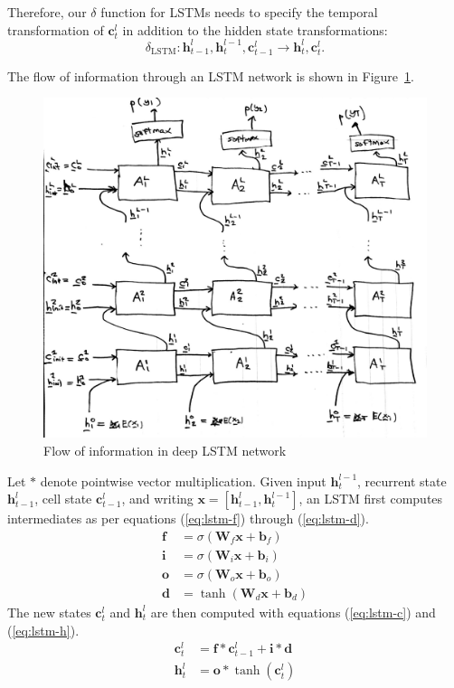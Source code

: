 \documentclass[12pt,a4paper,twoside,openright]{report}
\newcommand{\vect}[1]{\boldsymbol{\mathbf{#1}}}
\begin{document}
Therefore, our $\delta$ function for LSTMs needs to specify the temporal
transformation of $\vect{c}_t^l$ in addition to the hidden state
transformations:
$$ \delta_{\mathrm{LSTM}} : \vect{h}_{t-1}^l, \vect{h}_t^{l-1}, \vect{c}_{t-1}^l
\rightarrow \vect{h}_t^l, \vect{c}_t^l. $$

The flow of information through an LSTM network is shown in
Figure~\ref{fig:deep-lstm-arch}.

\begin{figure}[H]
\centering
\includegraphics[width=400pt]{figs/lstm_net_tmp.jpg}
\caption{Flow of information in deep LSTM network}
\label{fig:deep-lstm-arch}
\end{figure}

Let $\ast$ denote pointwise vector multiplication. Given input
$\vect{h}_t^{l-1}$, recurrent state $\vect{h}_{t-1}^l$, cell state
$\vect{c}_{t-1}^l$, and writing $\vect{x} = [\vect{h}_{t-1}^l,
\vect{h}_t^{l-1}]$, an LSTM first computes intermediates as per equations
(\ref{eq:lstm-f}) through (\ref{eq:lstm-d}).
\begin{align}
  \vect{f} &= \sigma(\vect{W}_f \vect{x} + \vect{b}_f) \label{eq:lstm-f} \\
  \vect{i} &= \sigma(\vect{W}_i \vect{x} + \vect{b}_i) \\
  \vect{o} &= \sigma(\vect{W}_o \vect{x} + \vect{b}_o) \\
  \vect{d} &= \tanh(\vect{W}_d \vect{x} + \vect{b}_d) \label{eq:lstm-d}
\end{align}
The new states $\vect{c}_t^l$ and $\vect{h}_t^l$ are then computed with
equations (\ref{eq:lstm-c}) and (\ref{eq:lstm-h}). 
\begin{align}
  \vect{c}_t^l &= \vect{f} \ast \vect{c}_{t-1}^l + \vect{i} \ast \vect{d}
  \label{eq:lstm-c} \\
  \vect{h}_t^l &= \vect{o} \ast \tanh(\vect{c}_t^l) \label{eq:lstm-h}
\end{align}
\end{document}
